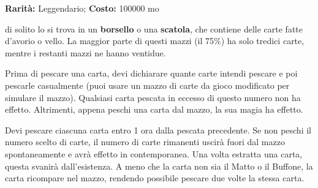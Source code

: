 \begin{multicols}{2}

\textbf{Rarità:} Leggendario; \textbf{Costo:} 100000 mo

di solito lo si trova in un \textbf{borsello} o una \textbf{scatola}, che contiene delle carte fatte d'avorio o vello. La maggior parte di questi mazzi (il 75\%) ha solo tredici carte, mentre i restanti mazzi ne hanno ventidue.

Prima di pescare una carta, devi dichiarare quante carte intendi pescare e poi pescarle casualmente (puoi usare un mazzo di carte da gioco modificato per simulare il mazzo). Qualsiasi carta pescata in eccesso di questo numero non ha effetto. Altrimenti, appena peschi una carta dal mazzo, la sua magia ha effetto.

Devi pescare ciascuna carta entro 1 ora dalla pescata precedente. Se non peschi il numero scelto di carte, il numero di carte rimanenti uscirà fuori dal mazzo spontaneamente e avrà effetto in contemporanea. Una volta estratta una carta, questa svanirà dall'esistenza. A meno che la carta non sia il Matto o il Buffone, la carta ricompare nel mazzo, rendendo possibile pescare due volte la stessa carta.

\medskip


\end{multicols}
